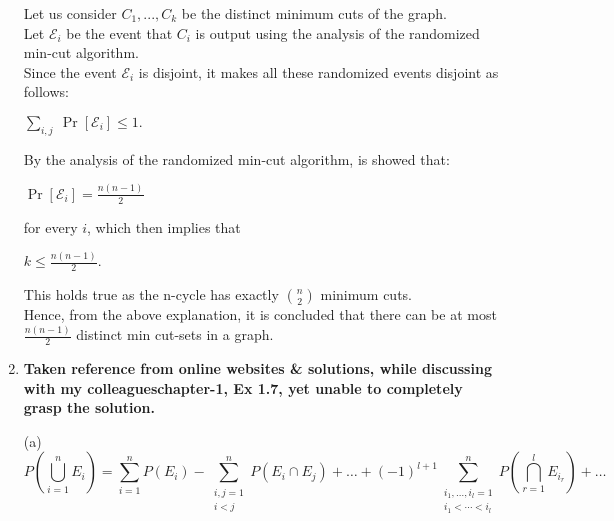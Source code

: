 \documentclass{article}
\begin{document}
\begin{enumerate}
    \textnormal{Let us consider $C_1, ...,C_k$ be the distinct minimum cuts of the graph.}\\
    \textnormal{Let $\mathcal{E}_i$ be the event that $C_i$ is output using the analysis of the randomized min-cut algorithm.}\\
    \textnormal{Since the event $\mathcal{E}_i$ is disjoint, it makes all these randomized events disjoint as follows:}\\
    \begin{center}
        $\sum_{i,j} \ \Pr[\mathcal{E}_i] \leq 1.$
    \end{center}
    \textnormal{By the analysis of the randomized min-cut algorithm, is showed that:}\\
    \begin{center}
        $\Pr[\mathcal{E}_i] = \frac{n(n-1)}{2}$
    \end{center}
    \textnormal{for every $i$, which then implies that}\\
    \begin{center}
        $k \leq \frac{n(n-1)}{2}.$
    \end{center}
    \textnormal{This holds true as the n-cycle has exactly $\binom{n}{2}$ minimum cuts.}\\
    \textnormal{Hence, from the above explanation, it is concluded that there can be at most $\frac{n(n-1)}{2}$ distinct min cut-sets in a graph.}\\
\newpage
\item \textbf{Taken reference from online websites \& solutions, while discussing with my colleagues\newline chapter-1, Ex 1.7, yet unable to completely grasp the solution.}\\
\item[(a)]\begin{equation*}
  P\left(\bigcup_{i=1}^{n} E_i\right) = \sum_{i=1}^{n} P(E_i) - \sum_{\substack{i,j=1 \\ i < j}}^{n} P(E_i \cap E_j) + \ldots + (-1)^{l+1} \sum_{\substack{i_1,\ldots,i_l=1 \\ i_1 < \cdots < i_l}}^{n} P\left(\bigcap_{r=1}^{l} E_{i_r}\right) + \ldots
  \end{equation*}
  

\end{enumerate}
\end{document}
